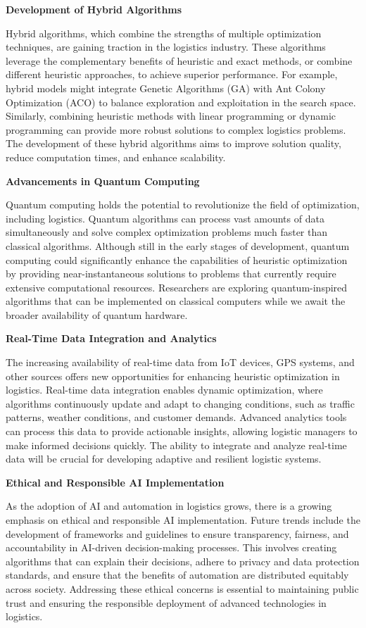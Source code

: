 \documentclass[
]{article}
\begin{document}
\textbf{Development of Hybrid Algorithms}

Hybrid algorithms, which combine the strengths of multiple optimization techniques, are gaining traction in the logistics industry. These algorithms leverage the complementary benefits of heuristic and exact methods, or combine different heuristic approaches, to achieve superior performance. For example, hybrid models might integrate Genetic Algorithms (GA) with Ant Colony Optimization (ACO) to balance exploration and exploitation in the search space. Similarly, combining heuristic methods with linear programming or dynamic programming can provide more robust solutions to complex logistics problems. The development of these hybrid algorithms aims to improve solution quality, reduce computation times, and enhance scalability.

\textbf{Advancements in Quantum Computing}

Quantum computing holds the potential to revolutionize the field of optimization, including logistics. Quantum algorithms can process vast amounts of data simultaneously and solve complex optimization problems much faster than classical algorithms. Although still in the early stages of development, quantum computing could significantly enhance the capabilities of heuristic optimization by providing near-instantaneous solutions to problems that currently require extensive computational resources. Researchers are exploring quantum-inspired algorithms that can be implemented on classical computers while we await the broader availability of quantum hardware.

\textbf{Real-Time Data Integration and Analytics}

The increasing availability of real-time data from IoT devices, GPS systems, and other sources offers new opportunities for enhancing heuristic optimization in logistics. Real-time data integration enables dynamic optimization, where algorithms continuously update and adapt to changing conditions, such as traffic patterns, weather conditions, and customer demands. Advanced analytics tools can process this data to provide actionable insights, allowing logistic managers to make informed decisions quickly. The ability to integrate and analyze real-time data will be crucial for developing adaptive and resilient logistic systems.

\textbf{Ethical and Responsible AI Implementation}

As the adoption of AI and automation in logistics grows, there is a growing emphasis on ethical and responsible AI implementation. Future trends include the development of frameworks and guidelines to ensure transparency, fairness, and accountability in AI-driven decision-making processes. This involves creating algorithms that can explain their decisions, adhere to privacy and data protection standards, and ensure that the benefits of automation are distributed equitably across society. Addressing these ethical concerns is essential to maintaining public trust and ensuring the responsible deployment of advanced technologies in logistics.
\end{document}
